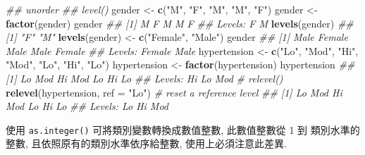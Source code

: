 \documentclass[
]{book}
\newenvironment{Shaded}{\begin{snugshade}}{\end{snugshade}}
\newcommand{\CommentTok}[1]{\textcolor[rgb]{0.56,0.35,0.01}{\textit{#1}}}
\newcommand{\DataTypeTok}[1]{\textcolor[rgb]{0.13,0.29,0.53}{#1}}
\newcommand{\KeywordTok}[1]{\textcolor[rgb]{0.13,0.29,0.53}{\textbf{#1}}}
\newcommand{\NormalTok}[1]{#1}
\newcommand{\StringTok}[1]{\textcolor[rgb]{0.31,0.60,0.02}{#1}}
\begin{document}
\begin{Shaded}
\begin{Highlighting}[]
\CommentTok{\#\# unorder}
\CommentTok{\#\# level()}
\NormalTok{gender \textless{}{-}}\StringTok{ }\KeywordTok{c}\NormalTok{(}\StringTok{"M"}\NormalTok{, }\StringTok{"F"}\NormalTok{, }\StringTok{"M"}\NormalTok{, }\StringTok{"M"}\NormalTok{, }\StringTok{"F"}\NormalTok{)}
\NormalTok{gender \textless{}{-}}\StringTok{ }\KeywordTok{factor}\NormalTok{(gender)}
\NormalTok{gender}
\CommentTok{\#\# [1] M F M M F}
\CommentTok{\#\# Levels: F M}
\KeywordTok{levels}\NormalTok{(gender)}
\CommentTok{\#\# [1] "F" "M"}
\KeywordTok{levels}\NormalTok{(gender) \textless{}{-}}\StringTok{ }\KeywordTok{c}\NormalTok{(}\StringTok{"Female"}\NormalTok{, }\StringTok{"Male"}\NormalTok{)}
\NormalTok{gender}
\CommentTok{\#\# [1] Male   Female Male   Male   Female}
\CommentTok{\#\# Levels: Female Male}
\NormalTok{hypertension \textless{}{-}}\StringTok{ }\KeywordTok{c}\NormalTok{(}\StringTok{"Lo"}\NormalTok{, }\StringTok{"Mod"}\NormalTok{, }\StringTok{"Hi"}\NormalTok{, }\StringTok{"Mod"}\NormalTok{, }\StringTok{"Lo"}\NormalTok{, }\StringTok{"Hi"}\NormalTok{, }\StringTok{"Lo"}\NormalTok{)}
\NormalTok{hypertension \textless{}{-}}\StringTok{ }\KeywordTok{factor}\NormalTok{(hypertension)}
\NormalTok{hypertension}
\CommentTok{\#\# [1] Lo  Mod Hi  Mod Lo  Hi  Lo }
\CommentTok{\#\# Levels: Hi Lo Mod}
\CommentTok{\# relevel()}
\KeywordTok{relevel}\NormalTok{(hypertension, }\DataTypeTok{ref =} \StringTok{"Lo"}\NormalTok{) }\CommentTok{\# reset a reference level}
\CommentTok{\#\# [1] Lo  Mod Hi  Mod Lo  Hi  Lo }
\CommentTok{\#\# Levels: Lo Hi Mod}
\end{Highlighting}
\end{Shaded}

使用 \texttt{as.integer()}
可將類別變數轉換成數值整數,
此數值整數從 1 到 類別水準的整數,
且依照原有的類別水準依序給整數,
使用上必須注意此差異.
\end{document}
